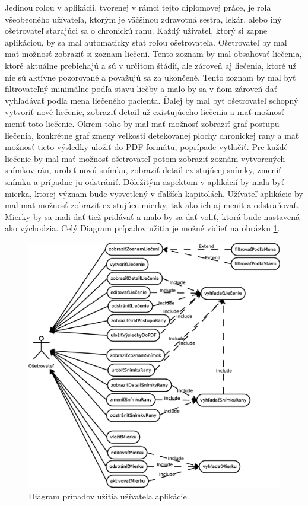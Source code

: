 Jedinou rolou v aplikácií, tvorenej v rámci tejto diplomovej práce, je rola všeobecného užívateľa, ktorým je väčšinou zdravotná sestra, lekár, alebo iný ošetrovateľ starajúci sa o chronickú ranu. Každý užívateľ, ktorý si zapne aplikáciou, by sa mal automaticky stať roľou ošetrovateľa. Ošetrovateľ by mal mať možnosť zobraziť si zoznam liečení. Tento zoznam by mal obsahovať liečenia, ktoré aktuálne prebiehajú a sú v určitom štádií, ale zároveň aj liečenia, ktoré už nie sú aktívne pozorované a považujú sa za ukončené. Tento zoznam by mal byť filtrovateľný minimálne podľa stavu liečby a malo by sa v ňom zároveň dať vyhľadávať podľa mena liečeného pacienta. Ďalej by mal byť ošetrovateľ schopný vytvoriť nové liečenie, zobraziť detail už existujúceho liečenia a mať možnosť meniť toto liečenie. Okrem toho by mal mať možnosť zobraziť graf postupu liečenia, konkrétne graf zmeny veľkosti detekovanej plochy chronickej rany a mať možnosť tieto výsledky uložiť do PDF formátu, poprípade vytlačiť. Pre každé liečenie by mal mať možnosť ošetrovateľ potom zobraziť zoznám vytvorených snímkov rán, urobiť novú snímku, zobraziť detail existujúcej snímky, zmeniť snímku a prípadne ju odstrániť. Dôležitým aspektom v aplikácií by mala byť mierka, ktorej význam bude vysvetlený v ďalších kapitolách. Užívateľ aplikácie by mal mať možnosť zobraziť existujúce mierky, tak ako ich aj meniť a odstraňovať. Mierky by sa mali dať tiež pridávať a malo by sa dať voliť, ktorá bude nastavená ako východzia. Celý Diagram prípadov užitia je možné vidieť na obrázku \ref{fig:usecase}.
\begin{figure}[h]
      \centering
      \includegraphics[scale=0.420]{fig/use-case.eps}
      \caption{Diagram prípadov užitia užívateľa aplikácie.}
      \label{fig:usecase}
\end{figure}

